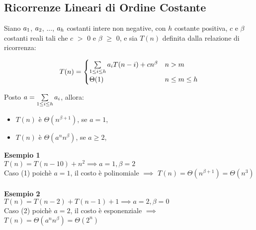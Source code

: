 \documentclass[../cheatSheetAlgoritmi.tex]{subfiles}
\begin{document}
\subsection{Ricorrenze Lineari di Ordine Costante}
Siano $a\textsubscript{$1$}$, $a\textsubscript{$2$}$, $...$, $a\textsubscript{$h$}$ costanti intere non negative, con $h$ costante positiva, $c$ e $\beta$ costanti reali tali che $c$ $>$ 0 e $\beta$ $\geq$ 0, e sia $T(n)$ definita dalla relazione di ricorrenza:
\begin{center}
	\begin{equation*}
  		T(n)=\begin{cases}
     		\sum\limits_{1 \leq i \leq h} {a \textsubscript{$i$} T(n-i)} + cn^{\beta} & \text{$n > m$}\\
    		\Theta(1) & \text{$n \leq m \leq h$}
  		\end{cases}
	\end{equation*}
\end{center}

Posto $a = \sum\limits_{1 \leq i \leq h} {a \textsubscript{$i$}}$, allora: 

\begin{itemize}
	\item $T(n)$ è $\Theta(n^{\beta+1})$, se $a = 1$,
	\item $T(n)$ è $\Theta(a^{n}n^{\beta})$, se $a \geq 2$,
\end{itemize}
\textbf{Esempio 1}\\
$T(n) = T(n - 10) + n^{2} \implies a = 1, \beta = 2$\\
Caso (1) poichè $a = 1$, il costo è polinomiale $\implies$ $T(n) = \Theta(n^{\beta+1}) = \Theta(n^{3})$\\\\
\textbf{Esempio 2}\\
$T(n) = T(n - 2) +  T(n - 1) + 1 \implies a = 2, \beta = 0$\\
Caso (2) poichè $a = 2$, il costo è esponenziale $\implies$ $T(n) = \Theta(a^{n}n^{\beta}) = \Theta(2^n)$
\end{document}
